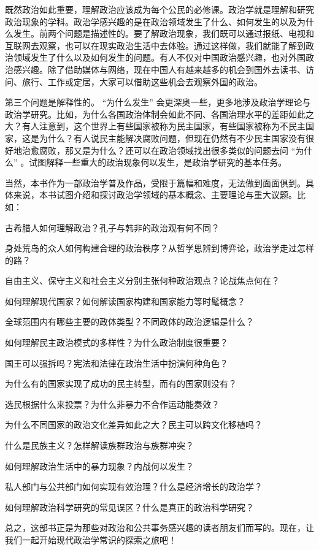 既然政治如此重要，理解政治应该成为每个公民的必修课。政治学就是理解和研究政治现象的学科。政治学感兴趣的是在政治领域发生了什么、如何发生的以及为什么发生。前两个问题是描述性的。要了解政治现象，我们既可以通过报纸、电视和互联网去观察，也可以在现实政治生活中去体验。通过这样做，我们就能了解到政治领域发生了什么以及如何发生的问题。有人不仅对中国政治感兴趣，也对外国政治感兴趣。除了借助媒体与网络，现在中国人有越来越多的机会到国外去读书、访问、旅行、工作或定居，大家可以借助这些机会去观察外国的政治。

第三个问题是解释性的。 “为什么发生” 会更深奥一些，更多地涉及政治学理论与政治学研究。比如，为什么各国政治体制会如此不同、各国治理水平的差距如此之大？有人注意到，这个世界上有些国家被称为民主国家，有些国家被称为不民主国家，这是为什么？有人说民主能解决腐败问题，但现在仍然有不少民主国家没有很好地治愈腐败，那又是为什么？还可以在政治领域找出很多类似的问题去问 “为什么” 。试图解释一些重大的政治现象何以发生，是政治学研究的基本任务。

当然，本书作为一部政治学普及作品，受限于篇幅和难度，无法做到面面俱到。具体来说，本书试图介绍和探讨政治学领域的基本概念、主要理论与重大议题。比如：

古希腊人如何理解政治？孔子与韩非的政治观有何不同？

身处荒岛的众人如何构建合理的政治秩序？从哲学思辨到博弈论，政治学走过怎样的路？

自由主义、保守主义和社会主义分别主张何种政治观点？论战焦点何在？

如何理解现代国家？如何解读国家构建和国家能力等时髦概念？

全球范围内有哪些主要的政体类型？不同政体的政治逻辑是什么？

如何理解民主政治模式的多样性？为什么政治制度很重要？

国王可以强拆吗？宪法和法律在政治生活中扮演何种角色？

为什么有的国家实现了成功的民主转型，而有的国家则没有？

选民根据什么来投票？为什么非暴力不合作运动能奏效？

为什么不同国家的政治文化差异如此之大？民主可以跨文化移植吗？

什么是民族主义？怎样解读族群政治与族群冲突？

如何理解政治生活中的暴力现象？内战何以发生？

私人部门与公共部门如何实现有效治理？什么是经济增长的政治学？

如何理解政治科学研究的常见误区？什么是真正的政治科学研究？

总之，这部书正是为那些对政治和公共事务感兴趣的读者朋友们而写的。现在，让我们一起开始现代政治学常识的探索之旅吧！
